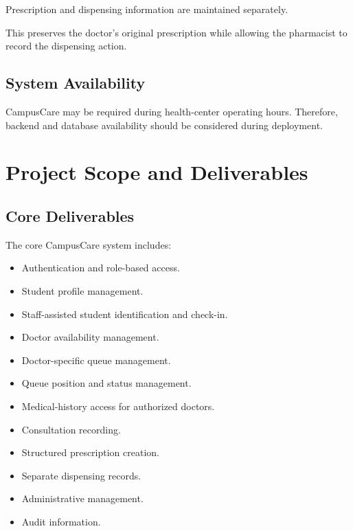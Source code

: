 \documentclass{tietreport}
\begin{document}
Prescription and dispensing information are maintained separately.

This preserves the doctor's original prescription while allowing the
pharmacist to record the dispensing action.

\section{System Availability}

CampusCare may be required during health-center operating hours.
Therefore, backend and database availability should be considered
during deployment.



\chapter{Project Scope and Deliverables}

\section{Core Deliverables}

The core CampusCare system includes:

\begin{itemize}

    \item Authentication and role-based access.
    
    \item Student profile management.
    
    \item Staff-assisted student identification and check-in.
    
    \item Doctor availability management.
    
    \item Doctor-specific queue management.
    
    \item Queue position and status management.
    
    \item Medical-history access for authorized doctors.
    
    \item Consultation recording.
    
    \item Structured prescription creation.
    
    \item Separate dispensing records.
    
    \item Administrative management.
    
    \item Audit information.

\end{itemize}
\end{document}

